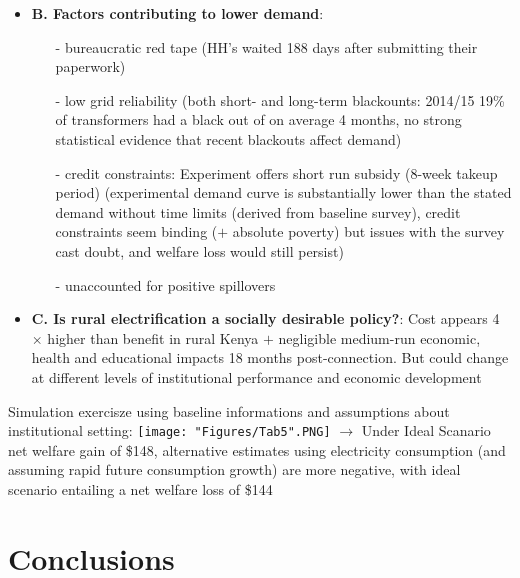 \documentclass[compress]{beamer}
\begin{document}
\begin{frame}
\begin{itemize} \footnotesize \setlength{\itemsep}{0.5em}
\item \textbf{B. Factors contributing to lower demand}: 
\begin{itemize}
\item[-] bureaucratic red tape (HH's waited 188 days after submitting their paperwork)
\item[-] low grid reliability (both short- and long-term blackounts: 2014/15 19\% of transformers had a black out of on average 4 months, no strong statistical evidence that recent blackouts affect demand)
\item[-] credit constraints: Experiment offers short run subsidy (8-week takeup period) (experimental demand curve is substantially lower than the stated demand without time limits (derived from baseline survey), credit constraints seem binding ($+$ absolute poverty) but issues with the survey cast doubt, and welfare loss would still persist)
\item[-] unaccounted for positive spillovers
\end{itemize}
\item \textbf{C. Is rural electrification a socially desirable policy?}: Cost appears 4 $\times $ higher than benefit in rural Kenya $+$ negligible medium-run economic, health and educational impacts 18 months post-connection. But could change at different levels of institutional performance and economic development 
\end{itemize}
\end{frame}


\begin{frame} \footnotesize
Simulation exercisze using baseline informations and assumptions about institutional setting: 
\texttt{[image: "Figures/Tab5".PNG]} 
$\to$ Under Ideal Scanario net welfare gain of \$148, alternative
estimates using electricity consumption (and assuming rapid future consumption growth) are
more negative, with ideal scenario entailing a net welfare loss of \$144
\end{frame}


\section{Conclusions}
\end{document}
